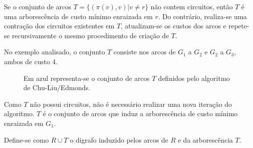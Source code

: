 \documentclass[12pt, a4paper]{article}
\begin{document}
\begin{enumerate}
            Se o conjunto de arcos $T = \{(\pi(v), v) | v \neq r\}$ não contem circuitos, então $T$ é uma arborescência de custo mínimo enraizada em $r$.
            Do contrário, realiza-se uma contração dos circuitos existentes em $T$, atualizam-se os custos dos arcos e repete-se recursivamente o mesmo procedimento de criação de $T$.

            No exemplo analisado, o conjunto $T$ consiste nos arcos de $G_1$ a $G_2$ e $G_2$ a $G_3$, ambos de custo 4.

            \begin{figure}[H]
                \centering
            \caption{Em azul representa-se o conjunto de arcos $T$ definidos pelo algoritmo de Chu-Liu/Edmonds.}
            \label{chu-liu-p}
            \end{figure}


            Como $T$ não possui circuitos, não é necessário realizar uma nova iteração do algoritmo.
            $T$ é o conjunto de arcos que induz a arborescência de custo mínimo enraizada em $G_1$.

            Define-se como $R \cup T$ o digrafo induzido pelos arcos de $R$ e da arborescência $T$.


        \begin{figure}[H]
            \centering
            \begin{tikzpicture}[node distance=3cm, every loop/.style={},thick,main node/.style={circle,draw,font=\sffamily\Large}]


\end{tikzpicture}
\end{figure}
\end{enumerate}
\end{document}
